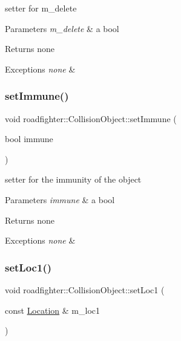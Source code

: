 setter for m\+\_\+delete 
\begin{DoxyParams}{Parameters}
{\em m\+\_\+delete} & a bool \\
\hline
\end{DoxyParams}
\begin{DoxyReturn}{Returns}
none 
\end{DoxyReturn}

\begin{DoxyExceptions}{Exceptions}
{\em none} & \\
\hline
\end{DoxyExceptions}
\mbox{\label{classroadfighter_1_1CollisionObject_a5be38a4125e25e85ff094aeca94c7d8e}} 
\subsubsection{\texorpdfstring{set\+Immune()}{setImmune()}}
{\footnotesize\ttfamily void roadfighter\+::\+Collision\+Object\+::set\+Immune (\begin{DoxyParamCaption}\item[{bool}]{immune }\end{DoxyParamCaption})}

setter for the immunity of the object 
\begin{DoxyParams}{Parameters}
{\em immune} & a bool \\
\hline
\end{DoxyParams}
\begin{DoxyReturn}{Returns}
none 
\end{DoxyReturn}

\begin{DoxyExceptions}{Exceptions}
{\em none} & \\
\hline
\end{DoxyExceptions}
\mbox{\label{classroadfighter_1_1CollisionObject_a3e0d924b453c9003a4992046fa3c52e1}} 
\subsubsection{\texorpdfstring{set\+Loc1()}{setLoc1()}}
{\footnotesize\ttfamily void roadfighter\+::\+Collision\+Object\+::set\+Loc1 (\begin{DoxyParamCaption}\item[{const \hyperlink{classroadfighter_1_1Location}{Location} \&}]{m\+\_\+loc1 }\end{DoxyParamCaption})}

